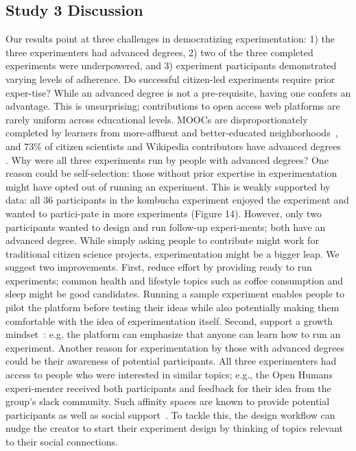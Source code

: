 \subsection{Study 3 Discussion}
Our results point at three challenges in democratizing experimentation: 1) the three experimenters had advanced degrees, 2) two of the three completed experiments were underpowered, and 3) experiment participants demonstrated varying levels of adherence. 
Do successful citizen-led experiments require prior exper-tise? While an advanced degree is not a pre-requisite, having one confers an advantage. This is unsurprising; contributions to open access web platforms are rarely uniform across educational levels. MOOCs are disproportionately completed by learners from more-affluent and better-educated neighborhoods~\cite{hansen2015democratizing}, and 73\% of citizen scientists and Wikipedia contributors have advanced degrees~\cite{national2018learning, Wikipedia} . 
Why were all three experiments run by people with advanced degrees? One reason could be self-selection: those without prior expertise in experimentation might have opted out of running an experiment. This is weakly supported by data: all 36 participants in the kombucha experiment enjoyed the experiment and wanted to partici-pate in more experiments (Figure 14). However, only two participants wanted to design and run follow-up experi-ments; both have an advanced degree. While simply asking people to contribute might work for traditional citizen science projects, experimentation might be a bigger leap. We suggest two improvements. First, reduce effort by providing ready to run experiments; common health and lifestyle topics such as coffee consumption and sleep might be good candidates. Running a sample experiment enables people to pilot the platform before testing their ideas while also potentially making them comfortable with the idea of experimentation itself. Second, support a growth mindset~\cite{dweck2016having}: e.g. the platform can emphasize that anyone can learn how to run an experiment.
Another reason for experimentation by those with advanced degrees could be their awareness of potential participants. All three experimenters had access to people who were interested in similar topics; e.g., the Open Humans experi-menter received both participants and feedback for their idea from the group’s slack community. Such affinity spaces are known to provide potential participants as well as social support~\cite{gee2005semiotic}. To tackle this, the design workflow can nudge the creator to start their experiment design by thinking of topics relevant to their social connections.

